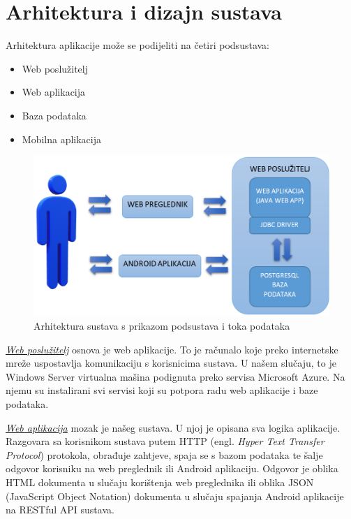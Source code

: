 \chapter{Arhitektura i dizajn sustava}

	Arhitektura aplikacije može se podijeliti na četiri podsustava:
	\begin{itemize}
		\item Web poslužitelj
		\item Web aplikacija
		\item Baza podataka
		\item Mobilna aplikacija
	\end{itemize}

	\begin{figure}[H]
		\includegraphics[scale=0.7]{Slike/Arhitektura sustava.PNG}
		\centering
		\caption{Arhitektura sustava s prikazom podsustava i toka podataka}
		\label{fig:dijagramSustava}
	\end{figure}

	\textit{\underline{Web poslužitelj}} osnova je web aplikacije. To je računalo koje preko internetske mreže uspostavlja komunikaciju s korisnicima sustava. U našem slučaju, to je Windows Server virtualna mašina podignuta preko servisa Microsoft Azure. Na njemu su instalirani svi servisi koji su potpora radu web aplikacije i baze podataka.
	
	\textit{\underline{Web aplikacija}} mozak je našeg sustava. U njoj je opisana sva logika aplikacije. Razgovara sa korisnikom sustava putem HTTP (engl. \textit{Hyper
	Text Transfer Protocol}) protokola, obrađuje zahtjeve, spaja se s bazom podataka te šalje odgovor korisniku na web preglednik ili Android aplikaciju. Odgovor je oblika HTML dokumenta u slučaju korištenja web preglednika ili oblika JSON (JavaScript Object Notation) dokumenta u slučaju spajanja Android aplikacije na RESTful API sustava.

